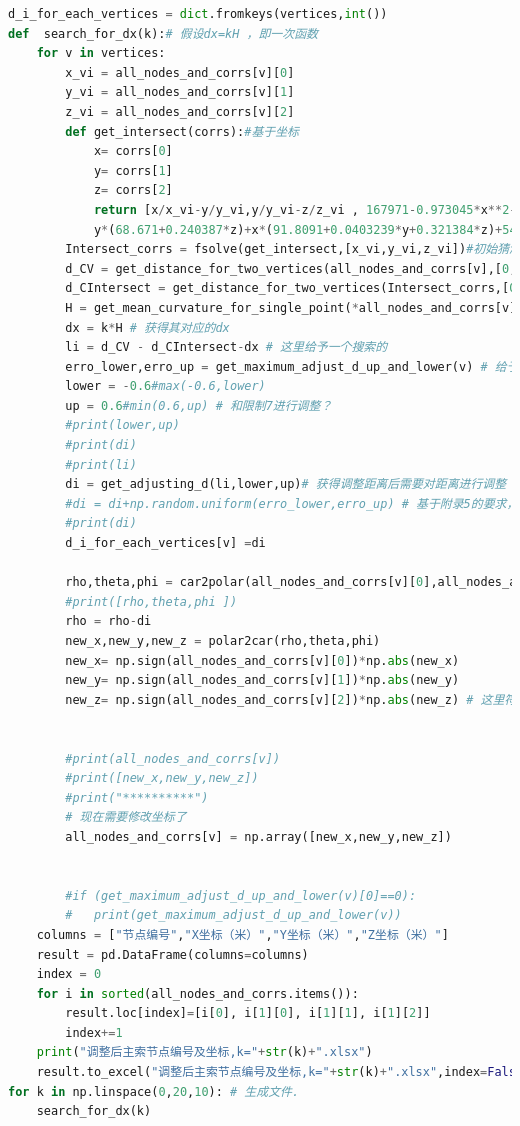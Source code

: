 \documentclass[withoutpreface,bwprint]{cumcmthesis} %
\begin{document}
\begin{appendices}
\begin{lstlisting}[language=python]
d_i_for_each_vertices = dict.fromkeys(vertices,int())
def  search_for_dx(k):# 假设dx=kH ，即一次函数
    for v in vertices:
        x_vi = all_nodes_and_corrs[v][0]
        y_vi = all_nodes_and_corrs[v][1]
        z_vi = all_nodes_and_corrs[v][2]
        def get_intersect(corrs):#基于坐标
            x= corrs[0]
            y= corrs[1]
            z= corrs[2]
            return [x/x_vi-y/y_vi,y/y_vi-z/z_vi , 167971-0.973045*x**2-0.984919*y**2+
            y*(68.671+0.240387*z)+x*(91.8091+0.0403239*y+0.321384*z)+547.321*z-0.0420355*z**2]
        Intersect_corrs = fsolve(get_intersect,[x_vi,y_vi,z_vi])#初始猜测值[0,-1]
        d_CV = get_distance_for_two_vertices(all_nodes_and_corrs[v],[0,0,0])
        d_CIntersect = get_distance_for_two_vertices(Intersect_corrs,[0,0,0])
        H = get_mean_curvature_for_single_point(*all_nodes_and_corrs[v]) # 获得其对应的曲率
        dx = k*H # 获得其对应的dx 
        li = d_CV - d_CIntersect-dx # 这里给予一个搜索的 
        erro_lower,erro_up = get_maximum_adjust_d_up_and_lower(v) # 给予一个随机误差的范围
        lower = -0.6#max(-0.6,lower)
        up = 0.6#min(0.6,up) # 和限制7进行调整？
        #print(lower,up)
        #print(di)
        #print(li)
        di = get_adjusting_d(li,lower,up)# 获得调整距离后需要对距离进行调整
        #di = di+np.random.uniform(erro_lower,erro_up) # 基于附录5的要求，给予一个误差
        #print(di)
        d_i_for_each_vertices[v] =di 
        
        rho,theta,phi = car2polar(all_nodes_and_corrs[v][0],all_nodes_and_corrs[v][1],all_nodes_and_corrs[v][2])
        #print([rho,theta,phi ])
        rho = rho-di
        new_x,new_y,new_z = polar2car(rho,theta,phi)
        new_x= np.sign(all_nodes_and_corrs[v][0])*np.abs(new_x)
        new_y= np.sign(all_nodes_and_corrs[v][1])*np.abs(new_y)
        new_z= np.sign(all_nodes_and_corrs[v][2])*np.abs(new_z) # 这里符号计算有点问题，但是小幅度的转换并不会影响到角度
        
        
        #print(all_nodes_and_corrs[v])
        #print([new_x,new_y,new_z])
        #print("**********")
        # 现在需要修改坐标了
        all_nodes_and_corrs[v] = np.array([new_x,new_y,new_z])
        
        
        #if (get_maximum_adjust_d_up_and_lower(v)[0]==0):
        #   print(get_maximum_adjust_d_up_and_lower(v))
    columns = ["节点编号","X坐标（米）","Y坐标（米）","Z坐标（米）"]
    result = pd.DataFrame(columns=columns)
    index = 0
    for i in sorted(all_nodes_and_corrs.items()):
        result.loc[index]=[i[0], i[1][0], i[1][1], i[1][2]]  
        index+=1
    print("调整后主索节点编号及坐标,k="+str(k)+".xlsx")
    result.to_excel("调整后主索节点编号及坐标,k="+str(k)+".xlsx",index=False)
for k in np.linspace(0,20,10): # 生成文件.
    search_for_dx(k)




\end{lstlisting}
\end{appendices}
\end{document}
